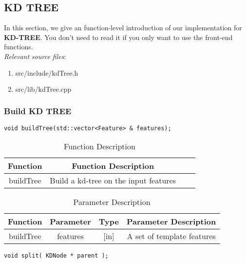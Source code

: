 \documentclass[paper=a4, fontsize=11pt]{scrartcl} %
\numberwithin{equation}{section} %
\numberwithin{figure}{section} %
\numberwithin{table}{section} %
\begin{document}
\subsection{KD TREE}  \label{sec-kd-tree}

In this section, we give an function-level introduction of our implementation for \textbf{KD-TREE}. You don't need to read it if you only want to use the front-end functions.  \\

\textsl{Relevant source files}: 

\begin{enumerate}
    \item src/include/kdTree.h
    \item src/lib/kdTree.cpp
\end{enumerate}

\subsubsection{Build KD TREE}

\begin{lstlisting}
void buildTree(std::vector<Feature> & features);
\end{lstlisting}

\begin{table}[h]
    \centering
    \begin{tabular}{|c|c| lp{}}
        \hline
        \textbf{Function} & \textbf{Function Description} \\\hline
    buildTree & Build a kd-tree on the input features \\\hline
    \end{tabular}
    \caption{Function Description}\label{nolock}
\end{table}

\begin{table}[H]
    \centering
    \begin{tabular}{|c|c|c|c|}
        \hline
        \textbf{Function} & \textbf{Parameter} & \textbf{Type} & \textbf{Parameter Description} \\\hline
            buildTree & features & [in] &A set of template features\\\hline
    \end{tabular}
    \caption{Parameter Description}\label{nolock}
\end{table}


\begin{lstlisting}
void split( KDNode * parent );
\end{lstlisting}
\end{document}
